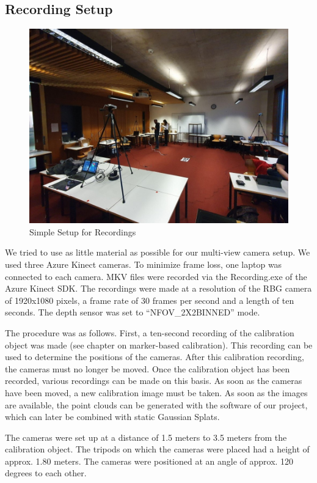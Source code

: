 \documentclass[conference]{IEEEtran}
\begin{document}
\subsection{Recording Setup}
\begin{figure}[h]
    \centering
    \includegraphics[width=1.0\linewidth]{Pictures/Aufbau.jpg}
    \caption{Simple Setup for Recordings}
    \label{Simple set-up for Recordings}
\end{figure}
We tried to use as little material as possible for our multi-view camera setup. We used three Azure Kinect cameras. To minimize frame loss, one laptop was connected to each camera. MKV files were recorded via the Recording.exe of the Azure Kinect SDK. The recordings were made at a resolution of the RBG camera of 1920x1080 pixels, a frame rate of 30 frames per second and a length of ten seconds. The depth sensor was set to “NFOV\_2X2BINNED” mode.

The procedure was as follows. First, a ten-second recording of the calibration object was made (see chapter on marker-based calibration). This recording can be used to determine the positions of the cameras. After this calibration recording, the cameras must no longer be moved. Once the calibration object has been recorded, various recordings can be made on this basis. As soon as the cameras have been moved, a new calibration image must be taken.
As soon as the images are available, the point clouds can be generated with the software of our project, which can later be combined with static Gaussian Splats.

The cameras were set up at a distance of 1.5 meters to 3.5 meters from the calibration object. The tripods on which the cameras were placed had a height of approx. 1.80 meters. The cameras were positioned at an angle of approx. 120 degrees to each other.
\end{document}
